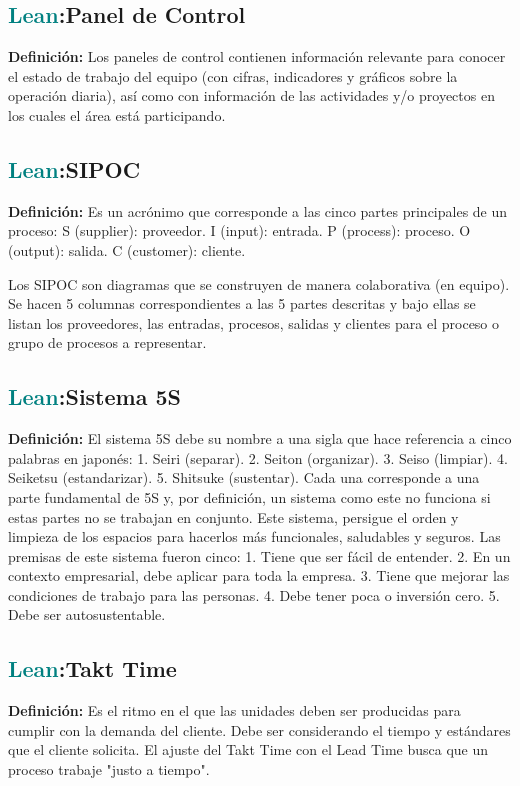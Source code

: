 \documentclass[12pt]{article}
\begin{document}
\subsection{\textcolor{teal}{Lean}:{Panel de Control}}
\textbf{Definición:} Los paneles de control contienen información relevante para conocer el estado de trabajo del equipo (con cifras, indicadores y gráficos sobre la operación diaria), así como con información de las actividades y/o proyectos en los cuales el área está participando.
\subsection{\textcolor{teal}{Lean}:{SIPOC}}
\textbf{Definición:} Es un acrónimo que corresponde a las cinco partes principales de un proceso:
S (supplier): proveedor.
I (input): entrada.
P (process): proceso.
O (output): salida.
C (customer): cliente.

Los SIPOC son diagramas que se construyen de manera colaborativa (en equipo). Se hacen 5 columnas correspondientes a las 5 partes descritas y bajo ellas se listan los proveedores, las entradas, procesos, salidas y clientes para el proceso o grupo de procesos a representar.
\subsection{\textcolor{teal}{Lean}:{Sistema 5S}}
\textbf{Definición:} El sistema 5S debe su nombre a una sigla que hace referencia a cinco palabras en japonés:
1.	Seiri (separar).
2.	Seiton (organizar).
3.	Seiso (limpiar).
4.	Seiketsu (estandarizar).
5.	Shitsuke (sustentar).
Cada una corresponde a una parte fundamental de 5S y, por definición, un sistema como este no funciona si estas partes no se trabajan en conjunto. Este sistema, persigue el orden y limpieza de los espacios para hacerlos más funcionales, saludables y seguros. Las premisas de este sistema fueron cinco:
1.	Tiene que ser fácil de entender.
2.	En un contexto empresarial, debe aplicar para toda la empresa.
3.	Tiene que mejorar las condiciones de trabajo para las personas.
4.	Debe tener poca o inversión cero.
5.	Debe ser autosustentable.
\subsection{\textcolor{teal}{Lean}:{Takt Time}}
\textbf{Definición:} Es el ritmo en el que las unidades deben ser producidas para cumplir con la demanda del cliente. Debe ser considerando el tiempo y estándares que el cliente solicita.
El ajuste del Takt Time con el Lead Time busca que un proceso trabaje "justo a tiempo".
\end{document}
